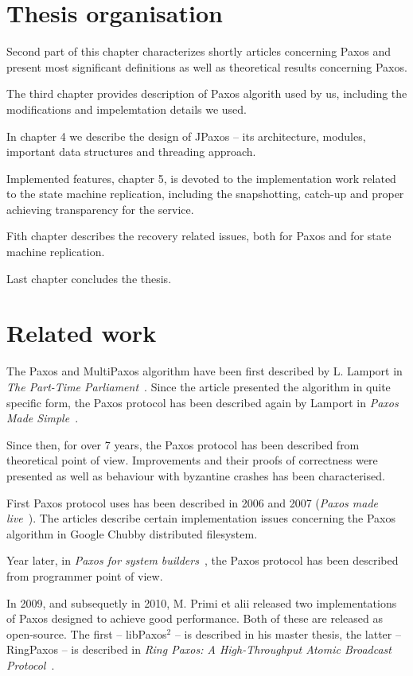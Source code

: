 \section{Thesis organisation}
Second part of this chapter characterizes shortly articles concerning Paxos and present most significant definitions as well as theoretical results concerning Paxos.

The third chapter provides description of Paxos algorith used by us, including the modifications and impelemtation details we used.

In chapter 4 we describe the design of JPaxos -- its architecture, modules, important data structures and threading approach.

Implemented features, chapter 5, is devoted to the implementation work related to the state machine replication, including the snapshotting, catch-up and proper achieving transparency for the service.

Fith chapter describes the recovery related issues, both for Paxos and for state machine replication.

Last chapter concludes the thesis. %

\section{Related work}

The Paxos and MultiPaxos algorithm have been first described by L. Lamport in \textit{The Part-Time Parliament}~\cite{Lam98}. Since the article presented the algorithm in quite specific form, the Paxos protocol has been described again by Lamport in \textit{Paxos Made Simple}~\cite{Lam01}.

Since then, for over 7 years, the Paxos protocol has been described from theoretical point of view. Improvements and their proofs of correctness were presented as well as behaviour with byzantine crashes has been characterised.

First Paxos protocol uses has been described in 2006 and 2007 (\textit{Paxos made live}~\cite{CGR07}). The articles describe certain implementation issues concerning the Paxos algorithm in Google Chubby distributed filesystem.

Year later, in \textit{Paxos for system builders}~\cite{AK08}, the Paxos protocol has been described from programmer point of view.

In 2009, and subsequetly in 2010, M. Primi et alii released two implementations of Paxos designed to achieve good performance. Both of these are released as open-source. The first -- libPaxos$^2$ -- is described in his master thesis, the latter -- RingPaxos -- is described in \textit{Ring Paxos: A High-Throughput Atomic Broadcast Protocol}~\cite{Mar10}.


